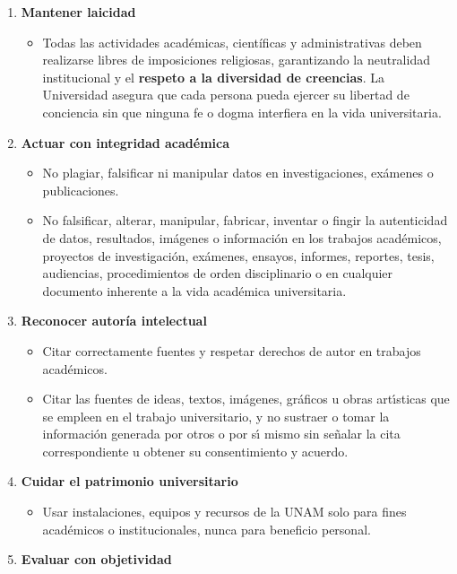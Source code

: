 \documentclass[
  spanish,
  12pt,
  letterpaper,
  DIV=11,
  numbers=noendperiod]{scrreprt}
\providecommand{\tightlist}{%
  \setlength{\itemsep}{0pt}\setlength{\parskip}{0pt}}
\begin{document}
\begin{enumerate}
\def\labelenumi{\arabic{enumi}.}
\setcounter{enumi}{3}
\tightlist
\item
  \textbf{Mantener laicidad}

  \begin{itemize}
  \tightlist
  \item
    Todas las actividades académicas, científicas y administrativas
    deben realizarse libres de imposiciones religiosas, garantizando la
    neutralidad institucional y el \textbf{respeto a la diversidad de
    creencias}. La Universidad asegura que cada persona pueda ejercer su
    libertad de conciencia sin que ninguna fe o dogma interfiera en la
    vida universitaria.
  \end{itemize}
\item
  \textbf{Actuar con integridad académica}

  \begin{itemize}
  \tightlist
  \item
    No plagiar, falsificar ni manipular datos en investigaciones,
    exámenes o publicaciones.
  \item
    No falsificar, alterar, manipular, fabricar, inventar o fingir la
    autenticidad de datos, resultados, imágenes o información en los
    trabajos académicos, proyectos de investigación, exámenes, ensayos,
    informes, reportes, tesis, audiencias, procedimientos de orden
    disciplinario o en cualquier documento inherente a la vida académica
    universitaria.
  \end{itemize}
\item
  \textbf{Reconocer autoría intelectual}

  \begin{itemize}
  \tightlist
  \item
    Citar correctamente fuentes y respetar derechos de autor en trabajos
    académicos.
  \item
    Citar las fuentes de ideas, textos, imágenes, gráficos u obras
    artı́sticas que se empleen en el trabajo universitario, y no sustraer
    o tomar la información generada por otros o por sı́ mismo sin señalar
    la cita correspondiente u obtener su consentimiento y acuerdo.
  \end{itemize}
\item
  \textbf{Cuidar el patrimonio universitario}

  \begin{itemize}
  \tightlist
  \item
    Usar instalaciones, equipos y recursos de la UNAM solo para fines
    académicos o institucionales, nunca para beneficio personal.
  \end{itemize}
\item
  \textbf{Evaluar con objetividad}


\end{enumerate}
\end{document}
